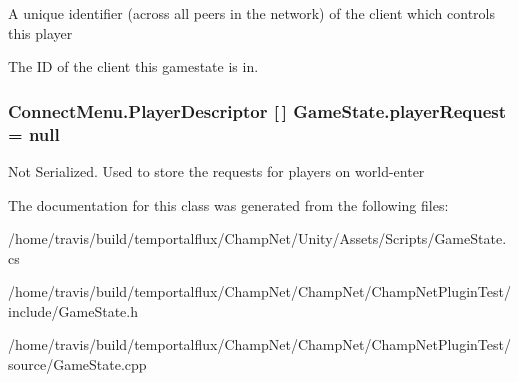 A unique identifier (across all peers in the network) of the client which controls this player 

The I\-D of the client this gamestate is in.\hypertarget{class_game_state_a8b1949523ac8e40776c0617666023d64}{
\subsubsection[{player\-Request}]{\setlength{\rightskip}{0pt plus 5cm}Connect\-Menu.\-Player\-Descriptor \mbox{[}$\,$\mbox{]} Game\-State.\-player\-Request = null}}\label{class_game_state_a8b1949523ac8e40776c0617666023d64}


Not Serialized. Used to store the requests for players on world-\/enter 



The documentation for this class was generated from the following files\-:\begin{DoxyCompactItemize}
\item 
/home/travis/build/temportalflux/\-Champ\-Net/\-Unity/\-Assets/\-Scripts/Game\-State.\-cs\item 
/home/travis/build/temportalflux/\-Champ\-Net/\-Champ\-Net/\-Champ\-Net\-Plugin\-Test/include/Game\-State.\-h\item 
/home/travis/build/temportalflux/\-Champ\-Net/\-Champ\-Net/\-Champ\-Net\-Plugin\-Test/source/Game\-State.\-cpp\end{DoxyCompactItemize}
